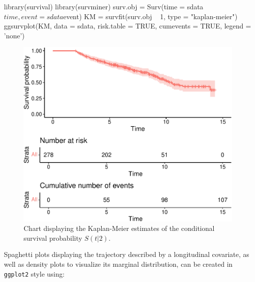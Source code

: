 \begin{Schunk}
\begin{Sinput}
library(survival)
library(survminer)
surv.obj = Surv(time = sdata$time, event = sdata$event)
KM = survfit(surv.obj ~ 1, type = "kaplan-meier")
ggsurvplot(KM, data = sdata, risk.table = TRUE, cumevents = TRUE, legend = 'none')
\end{Sinput}
\begin{figure}[htbp]

{\centering \includegraphics[width=5in]{pencal-RJ_files/figure-latex/kaplan-1} 

}

\caption[Chart displaying the Kaplan-Meier estimates of the conditional survival probability $S(t | 2)$]{Chart displaying the Kaplan-Meier estimates of the conditional survival probability $S(t | 2)$.}\label{fig:kaplan}
\end{figure}
\end{Schunk}

Spaghetti plots displaying the trajectory described by a longitudinal
covariate, as well as density plots to visualize its marginal
distribution, can be created in \texttt{ggplot2} style using:

